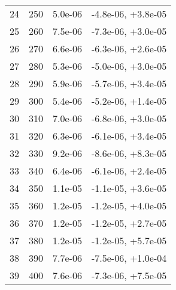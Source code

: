 \begin{table}
\begin{adjustbox}{width=1\textwidth/2}
\begin{tabular}{|c|c|c|c|}
\cline{1-4}
24 & 250 & 5.0e-06 & -4.8e-06, +3.8e-05 \\
\cline{1-4}
25 & 260 & 7.5e-06 & -7.3e-06, +3.0e-05 \\
\cline{1-4}
26 & 270 & 6.6e-06 & -6.3e-06, +2.6e-05 \\
\cline{1-4}
27 & 280 & 5.3e-06 & -5.0e-06, +3.0e-05 \\
\cline{1-4}
28 & 290 & 5.9e-06 & -5.7e-06, +3.4e-05 \\
\cline{1-4}
29 & 300 & 5.4e-06 & -5.2e-06, +1.4e-05 \\
\cline{1-4}
30 & 310 & 7.0e-06 & -6.8e-06, +3.0e-05 \\
\cline{1-4}
31 & 320 & 6.3e-06 & -6.1e-06, +3.4e-05 \\
\cline{1-4}
32 & 330 & 9.2e-06 & -8.6e-06, +8.3e-05 \\
\cline{1-4}
33 & 340 & 6.4e-06 & -6.1e-06, +2.4e-05 \\
\cline{1-4}
34 & 350 & 1.1e-05 & -1.1e-05, +3.6e-05 \\
\cline{1-4}
35 & 360 & 1.2e-05 & -1.2e-05, +4.0e-05 \\
\cline{1-4}
36 & 370 & 1.2e-05 & -1.2e-05, +2.7e-05 \\
\cline{1-4}
37 & 380 & 1.2e-05 & -1.2e-05, +5.7e-05 \\
\cline{1-4}
38 & 390 & 7.7e-06 & -7.5e-06, +1.0e-04 \\
\cline{1-4}
39 & 400 & 7.6e-06 & -7.3e-06, +7.5e-05 \\
\cline{1-4}
\end{tabular}
\end{adjustbox}
\end{table}

